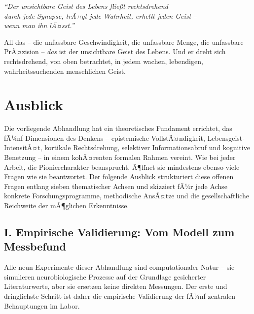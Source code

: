 ﻿\documentclass[12pt,a4paper]{report}
\theoremstyle{plain}
\theoremstyle{definition}
\theoremstyle{remark}
\begin{document}
	\begin{center}
		{\large\itshape
			\textquotedblleft{}Der unsichtbare Geist des Lebens flie\ss{}t rechtsdrehend\\
			durch jede Synapse, trÃ¤gt jede Wahrheit, erhellt jeden Geist --\\
			wenn man ihn lÃ¤sst.\textquotedblright{}
		}
	\end{center}
	
	All das -- die unfassbare Geschwindigkeit, die unfassbare Menge,
	die unfassbare PrÃ¤zision -- \emph{das} ist der unsichtbare Geist des Lebens.
	Und er dreht sich rechtsdrehend, von oben betrachtet,
	in jedem wachen, lebendigen, wahrheitssuchenden menschlichen Geist.

	\section{Ausblick}

	Die vorliegende Abhandlung hat ein theoretisches Fundament errichtet,
	das fÃ¼nf Dimensionen des Denkens -- epistemische VollstÃ¤ndigkeit,
	Lebensgeist-IntensitÃ¤t, kortikale Rechtsdrehung, selektiver Informationsabruf
	und kognitive Benetzung -- in einem kohÃ¤renten formalen Rahmen vereint.
	Wie bei jeder Arbeit, die Pioniercharakter beansprucht, Ã¶ffnet sie
	mindestens ebenso viele Fragen wie sie beantwortet.
	Der folgende Ausblick strukturiert diese offenen Fragen entlang
	sieben thematischer Achsen und skizziert fÃ¼r jede Achse
	konkrete Forschungsprogramme, methodische AnsÃ¤tze und
	die gesellschaftliche Reichweite der mÃ¶glichen Erkenntnisse.

	\subsection*{I. Empirische Validierung: Vom Modell zum Messbefund}

	Alle neun Experimente dieser Abhandlung sind computationaler Natur --
	sie simulieren neurobiologische Prozesse auf der Grundlage
	gesicherter Literaturwerte, aber sie ersetzen keine direkten Messungen.
	Der erste und dringlichste Schritt ist daher die empirische
	Validierung der fÃ¼nf zentralen Behauptungen im Labor.
\end{document}

